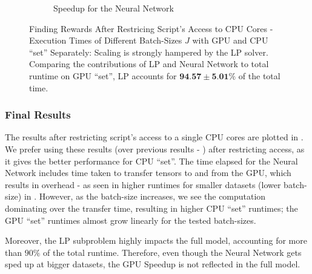 \begin{figure}[!htbp]
\begin{subfigure}{0.4\textwidth}
\begin{tikzpicture}
        \end{tikzpicture}
        \caption{Speedup for the Neural Network}
        \label{fig:Restricted Finding Rewards - Speedup for the Neural Network}
    \end{subfigure}
    \caption[Finding Rewards After Restricing Script's Access to CPU Cores - Execution Times of Different Batch-Sizes $J$ with GPU and CPU ``set'' Separately]{Finding Rewards After Restricing Script's Access to CPU Cores - Execution Times of Different Batch-Sizes $J$ with GPU and CPU ``set'' Separately: Scaling is strongly hampered by the LP solver. Comparing the contributions of LP and Neural Network to total runtime on GPU ``set'', LP accounts for $\textbf{94.57}\pm\textbf{5.01}\%$ of the total time.}
    \label{fig:Restricted Finding Rewards - Execution Times of Different Batch-Sizes J with GPU and CPUa ``set'' Separately}
\end{figure}

\subsubsection{Final Results}
The results after restricting script's access to a single CPU cores are plotted in . We prefer using these results (over previous results - ) after restricting access, as it gives the better performance for CPU ``set''. The time elapsed for the Neural Network includes time taken to transfer tensors to and from the GPU, which results in overhead - as seen in higher runtimes for smaller datasets (lower batch-size) in . However, as the batch-size increases, we see the computation dominating over the transfer time, resulting in higher CPU ``set'' runtimes; the GPU ``set'' runtimes almost grow linearly for the tested batch-sizes.

Moreover, the LP subproblem highly impacts the full model, accounting for more than $90\%$ of the total runtime. Therefore, even though the Neural Network gets sped up at bigger datasets, the GPU Speedup is not reflected in the full model.